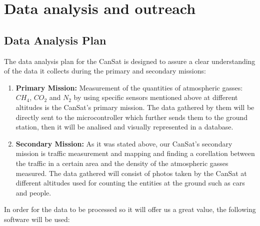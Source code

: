 \documentclass[11pt]{article}
\begin{document}
\section{Data analysis and outreach}

\subsection{Data Analysis Plan}
\hspace{0.5cm} The data analysis plan for the CanSat is designed to assure a clear understanding of the data it collects during the primary and secondary missions:
\begin{enumerate}
\item \textbf{Primary Mission:} Measurement of the quantities of atmospheric gasses: $CH_4$, $CO_2$ and $N_2$ by using specific sensors mentioned above at different altitudes is the CanSat's primary mission. The data gathered by them will be directly sent to the microcontroller which further sends them to the ground station, then it will be analised and visually represented in a database.
\item \textbf{Secondary Mission:} As it was stated above, our CanSat's secondary mission is traffic measurement and mapping and finding a corellation between the traffic in a certain area and the density of the atmospheric gasses measured. The data gathered will consist of photos taken by the CanSat at different altitudes used for counting the entities at the ground such as cars and people.
\end {enumerate}
\hspace{0.5cm} In order for the data to be processed so it will offer us a great value, the following software will be used:
\end{document}
